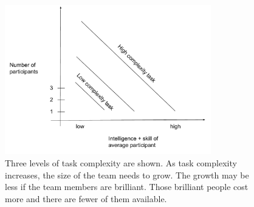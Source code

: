 \begin{figure}
\includegraphics[width=0.8\textwidth]{images/people-per-task-for-skill-level.pdf}
\caption{Three levels of task complexity are shown. As task complexity increases, the size of the team needs to grow. The growth may be less if the team members are brilliant. Those brilliant people cost more and there are fewer of them available.}
\end{figure}
